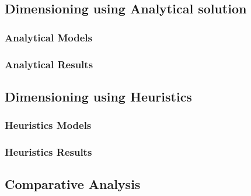 \subsection{Dimensioning using Analytical solution}

\subsubsection{Analytical Models}

\subsubsection{Analytical Results}

\newpage

\subsection{Dimensioning using Heuristics}

\subsubsection{Heuristics Models}

\subsubsection{Heuristics Results}

\subsection{Comparative Analysis}
